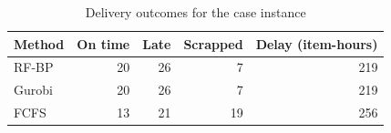 \begin{table}[htbp]
\centering\small
\caption{Delivery outcomes for the case instance}
\begin{tabular}{lrrrr}
\toprule
Method & On time & Late & Scrapped & Delay (item-hours) \\
\midrule
RF-BP & 20 & 26 & 7 & 219 \\
Gurobi & 20 & 26 & 7 & 219 \\
FCFS & 13 & 21 & 19 & 256 \\
\bottomrule
\end{tabular}
\end{table}